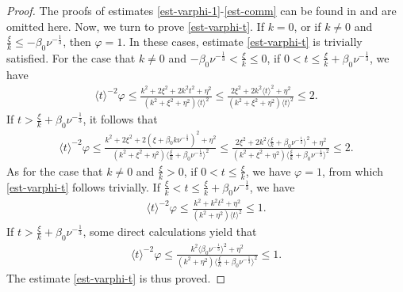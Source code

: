 \documentclass[11pt,reqno]{article}
\numberwithin{equation}{section}
\let\f=\frac
\begin{document}
\begin{proof}
	The proofs of estimates \eqref{est-varphi-1}-\eqref{est-comm} can be found in \cite{Bedrossian-Germain-Masmoudi-2017} and are omitted here.
	Now, we turn to prove \eqref{est-varphi-t}.
	If $k=0$, or if $k\not=0$ and $\f{\xi}{k}\leq -\beta_0\nu^{-\f13}$, then $\varphi=1$.
	In these cases, estimate \eqref{est-varphi-t} is trivially satisfied.
	For the case that $k\not=0$ and $-\beta_0\nu^{-\f13}<\f{\xi}{k}\leq 0$, if $0<t\leq\f{\xi}{k}+\beta_0 \nu^{-\f13}$, we have
	\begin{align*}
		\langle t\rangle^{-2} \varphi 
		\leq \f{k^2+2\xi^2+2k^2t^2+\eta^2}{(k^2+\xi^2+\eta^2)\langle t\rangle^2}
		\leq \f{2\xi^2+2k^2\langle t\rangle^2+\eta^2}{(k^2+\xi^2+\eta^2)\langle t\rangle^2}%
\leq 2.
	\end{align*}
	If $t>\f{\xi}{k}+\beta_0 \nu^{-\f13}$, it follows that
	\begin{align*}
		\langle t\rangle^{-2} \varphi 
		\leq \f{k^2+2\xi^2+2(\xi+\beta_0 k\nu^{-\f13})^2+\eta^2}{(k^2+\xi^2+\eta^2)\langle \f{\xi}{k}+\beta_0 \nu^{-\f13}\rangle^2}
		\leq \f{2\xi^2+2k^2\langle \f{\xi}{k}+\beta_0 \nu^{-\f13}\rangle^2+\eta^2}{(k^2+\xi^2+\eta^2)\langle \f{\xi}{k}+\beta_0 \nu^{-\f13}\rangle^2}
\leq 2.
	\end{align*}
	As for the case that $k\not=0$ and $\f{\xi}{k}> 0$, if $0<t\leq\f{\xi}{k}$, we have $\varphi=1$, from which \eqref{est-varphi-t} follows trivially.
	If $\f{\xi}{k}<t\leq \f{\xi}{k}+\beta_0 \nu^{-\f13}$, we have
	\begin{align*}
		\langle t\rangle^{-2} \varphi 
		\leq \f{k^2+k^2t^2+\eta^2}{(k^2+\eta^2)\langle t\rangle^2}
		\leq 1.
	\end{align*}
	If $t>\f{\xi}{k}+\beta_0 \nu^{-\f13}$, some direct calculations yield that
	\begin{align*}
		\langle t\rangle^{-2} \varphi 
		\leq \f{k^2\langle \beta_0 \nu^{-\f13}\rangle^2+\eta^2}{(k^2+\eta^2)\langle \f{\xi}{k}+\beta_0 \nu^{-\f13}\rangle^2}
		\leq 1.
	\end{align*}
	The estimate \eqref{est-varphi-t} is thus proved.
\end{proof}
\end{document}

